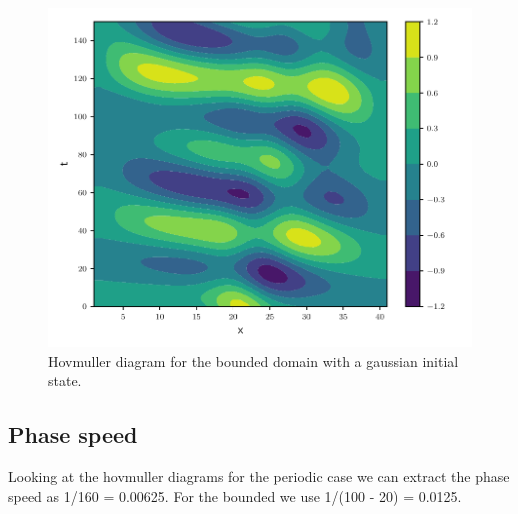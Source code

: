 \begin{figure}[htp]
  \centering
  \includegraphics[width=\textwidth]{../figures/psi_bounded_centered_gauss.pdf}
  \caption{Hovmuller diagram for the bounded domain with a gaussian initial
  state.}
  \label{fig:bounded_gauss}
\end{figure}


\subsection{Phase speed}


Looking at the hovmuller diagrams for the periodic case we
can extract the phase speed as 1/160 = 0.00625.
For the bounded we use 1/(100 - 20) = 0.0125.
